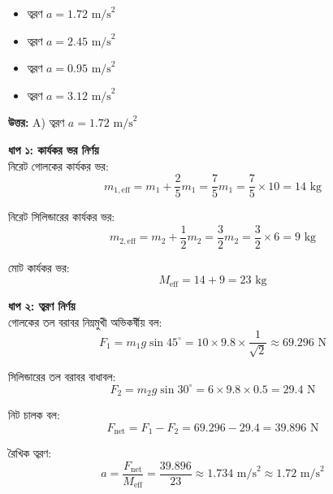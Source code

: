 \documentclass[12pt, a4paper]{article}
\begin{document}
\begin{itemize}[label={}, leftmargin=1cm, itemsep=0.5em]
    \item[\textbf{A)}] ত্বরণ $a = 1.72\text{ m/s}^2$
    \item[\textbf{B)}] ত্বরণ $a = 2.45\text{ m/s}^2$
    \item[\textbf{C)}] ত্বরণ $a = 0.95\text{ m/s}^2$
    \item[\textbf{D)}] ত্বরণ $a = 3.12\text{ m/s}^2$
\end{itemize}

\vspace{0.5em}
\begin{tcolorbox}[answerbox]
    \textbf{\color{success} উত্তর:} A) ত্বরণ $a = 1.72\text{ m/s}^2$
\end{tcolorbox}
\vspace{1em}

\begin{tcolorbox}[solutionbox={সমাধান (Solution)}]
    \noindent
    \textbf{ধাপ ১: কার্যকর ভর নির্ণয়} \\
    নিরেট গোলকের কার্যকর ভর:
    \[ m_{1, \text{eff}} = m_1 + \frac{2}{5} m_1 = \frac{7}{5} m_1 = \frac{7}{5} \times 10 = 14\text{ kg} \]
    
    নিরেট সিলিন্ডারের কার্যকর ভর:
    \[ m_{2, \text{eff}} = m_2 + \frac{1}{2} m_2 = \frac{3}{2} m_2 = \frac{3}{2} \times 6 = 9\text{ kg} \]
    
    মোট কার্যকর ভর:
    \[ M_{\text{eff}} = 14 + 9 = 23\text{ kg} \]
    
    \vspace{0.5em}
    \noindent\textbf{ধাপ ২: ত্বরণ নির্ণয়} \\
    গোলকের তল বরাবর নিম্নমুখী অভিকর্ষীয় বল:
    \[ F_1 = m_1 g \sin 45^\circ = 10 \times 9.8 \times \frac{1}{\sqrt{2}} \approx 69.296\text{ N} \]
    
    সিলিন্ডারের তল বরাবর বাধাবল:
    \[ F_2 = m_2 g \sin 30^\circ = 6 \times 9.8 \times 0.5 = 29.4\text{ N} \]
    
    নিট চালক বল:
    \[ F_{\text{net}} = F_1 - F_2 = 69.296 - 29.4 = 39.896\text{ N} \]
    
    রৈখিক ত্বরণ:
    \[ a = \frac{F_{\text{net}}}{M_{\text{eff}}} = \frac{39.896}{23} \approx 1.734\text{ m/s}^2 \approx \mathbf{1.72}\text{ m/s}^2 \]
\end{tcolorbox}
\end{document}
